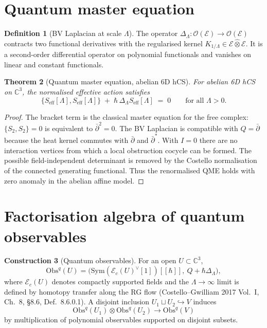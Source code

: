 \documentclass[11pt]{amsart}
\providecommand{\C}{\mathbb{C}}
\providecommand{\dbar}{\bar{\partial}}
\providecommand{\Obs}{\mathrm{Obs}}
\providecommand{\Sym}{\mathrm{Sym}}
\providecommand{\cE}{\mathcal{E}}
\providecommand{\cO}{\mathcal{O}}
\providecommand{\eff}{\mathrm{eff}}
\theoremstyle{plain}
\newtheorem{theorem}{Theorem}[section]
\theoremstyle{definition}
\newtheorem{definition}[theorem]{Definition}
\newtheorem{construction}[theorem]{Construction}
\theoremstyle{remark}
\begin{document}
\section{Quantum master equation}

\begin{definition}[BV Laplacian at scale $\Lambda$]\label{def:BV-Lap}
The operator $\Delta_\Lambda:\cO(\cE)\to\cO(\cE)$ contracts two
functional derivatives with the regularised kernel
	$K_{1/\Lambda}\in\cE\widehat{\otimes}\cE$. It is a second-order
differential operator on polynomial functionals and vanishes on linear
and constant functionals.
\end{definition}

\begin{theorem}[Quantum master equation, abelian 6D hCS]\label{thm:QME}
For abelian 6D hCS on $\C^3$, the normalised effective action satisfies
\[
\{S_\eff[\Lambda],S_\eff[\Lambda]\}
\;+\;\hbar\,\Delta_\Lambda S_\eff[\Lambda]
\;=\;0
\qquad\text{for all }\Lambda>0 .
\]
\end{theorem}

\begin{proof}
The bracket term is the classical master equation for the free complex:
$\{S_2,S_2\}=0$ is equivalent to $\dbar^2=0$. The BV Laplacian is
compatible with $Q=\dbar$ because the heat kernel commutes with
$\dbar$ and $\dbar^\ast$. With $I=0$ there are no interaction vertices
from which a local obstruction cocycle can be formed. The possible
field-independent determinant is removed by the Costello normalisation
of the connected generating functional. Thus the renormalised QME holds
with zero anomaly in the abelian affine model.
\end{proof}

\section{Factorisation algebra of quantum observables}

\begin{construction}[Quantum observables]\label{cons:Obs-q}
For an open $U\subset\C^3$,
\[
\Obs^q(U)
=
\bigl(\Sym(\cE_c(U)^\vee[1])[[\hbar]],\ Q+\hbar\Delta_\Lambda\bigr),
\]
where $\cE_c(U)$ denotes compactly supported fields and the
$\Lambda\to\infty$ limit is defined by homotopy transfer along the RG
flow (Costello--Gwilliam 2017 Vol.~I, Ch.~8, \S8.6,
Def.~8.6.0.1). A disjoint inclusion
$U_1\sqcup U_2\hookrightarrow V$ induces
\[
  \Obs^q(U_1)\otimes\Obs^q(U_2)\longrightarrow\Obs^q(V)
\]
by multiplication of polynomial observables supported on disjoint
subsets.
\end{construction}
\end{document}
